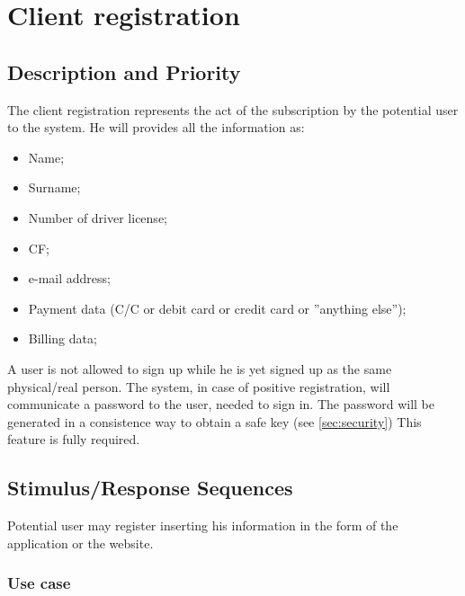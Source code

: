 \documentclass{scrreprt}
\begin{document}
\section{Client registration}
\begin{comment}$<$Don’t really say “System Feature 1.” State the feature name in just a few 
words.$>$
\end{comment}

\subsection{Description and Priority}
The client registration represents the act of the subscription by the potential user to the system. He will provides all the information as:

\begin{itemize}
\item Name;
\item Surname;
\item Number of driver license;
\item CF;
\item e-mail address;
\item Payment data (C/C or debit card or credit card or ''anything else'');
\item Billing data;
\end{itemize}

A user is not allowed to sign up while he is yet signed up as the same physical/real person. 
The system, in case of positive registration, will communicate a password to the user, needed to sign in.
The password will be generated in a consistence way to obtain a safe key (see \vref{sec:security})
This feature is fully required.
\begin{comment}$<$Provide a short description of the feature and indicate whether it is of 
High, Medium, or Low priority. You could also include specific priority 
component ratings, such as benefit, penalty, cost, and risk (each rated on a 
relative scale from a low of 1 to a high of 9).$>$
\end{comment}

\subsection{Stimulus/Response Sequences}
Potential user may register inserting his information in the form of the application or the website.

\subsubsection{Use case}
\end{document}
